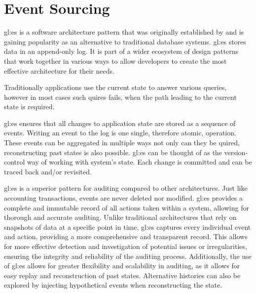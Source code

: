 %
\chapter{Event Sourcing}\label{chap:es}

\gls{gl:es} is a software architecture pattern that was originally established by \citep{fowleres} and is gaining popularity as an alternative to traditional database systems. \gls{gl:es} stores data in an append-only log. It is part of a wider ecosystem of design patterns that work together in various ways to allow developers to create the most effective architecture for their needs. 

Traditionally applications use the current state to answer various queries, however in most cases such quires fails, when the path leading to the current state is required.

\gls{gl:es} ensures that all changes to application state are stored as a sequence of events. Writing an event to the log is one single, therefore atomic, operation. These events can be aggregated in multiple ways not only can they be quired, reconstructing past states is also possible. \gls{gl:es} can be thought of as the version-control way of working with system's state. Each change is committed and can be traced back and/or revisited.

\gls{gl:es} is a superior pattern for auditing compared to other architectures. Just like accounting transactions, events are never deleted nor modified. \gls{gl:es} provides a complete and immutable record of all actions taken within a system, allowing for thorough and accurate auditing. Unlike traditional architectures that rely on snapshots of data at a specific point in time, \gls{gl:es} captures every individual event and action, providing a more comprehensive and transparent record. This allows for more effective detection and investigation of potential issues or irregularities, ensuring the integrity and reliability of the auditing process. Additionally, the use of \gls{gl:es} allows for greater flexibility and scalability in auditing, as it allows for easy replay and reconstruction of past states. Alternative histories can also be explored by injecting hypothetical events when reconstructing the state.



